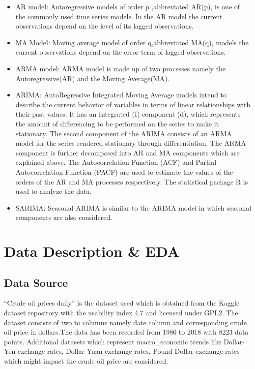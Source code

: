 \documentclass[11pt,a4paper]{article}
\begin{document}
\begin{itemize}
	\item AR model: Autoregressive models of order p ,abbreviated AR(p), is one of the commonly used time series models. In the AR model the current observations depend on the level of its lagged observations. 
	
	\item MA Model: Moving average model of order q,abbreviated MA(q), models the current observations depend on the error term of  lagged observations. 
	
	\item ARMA model: ARMA model is made up of two processes namely the Autoregressive(AR) and the Moving Average(MA).
	
	\item ARIMA: AutoRegressive Integrated Moving Average models intend to describe the current
	behavior of variables in terms of linear relationships with their past values. It has an
	Integrated (I) component (d), which represents the amount of differencing to be performed
	on the series to make it stationary. The second component of the ARIMA consists of an
	ARMA model for the series rendered stationary through differentiation. The ARMA
	component is further decomposed into AR and MA components which are explained
	above. The Autocorrelation Function (ACF) and Partial Autocorrelation Function (PACF) are
	used to estimate the values of the orders of the AR and MA processes respectively. The
	statistical package R is used to analyze the data.
	
	\item SARIMA: Seasonal ARIMA is similar to the ARIMA model in which seasonal components are also considered.
	
	
	
\end{itemize}
\section{Data Description \& EDA}

\subsection{Data Source}

“Crude oil prices daily” is the dataset used which is obtained from the Kaggle dataset repository with the usability index 4.7 and licensed under GPL2. The dataset consists of two to columns namely date column  and corresponding crude oil price in dollars.The data has been recorded from 1986 to 2018 with 8223 data points. Additional datasets which represent macro\_economic trends like Dollar-Yen exchange rates, Dollar-Yuan exchange rates, Pound-Dollar exchange rates which might impact the crude oil price are considered.
\end{document}
